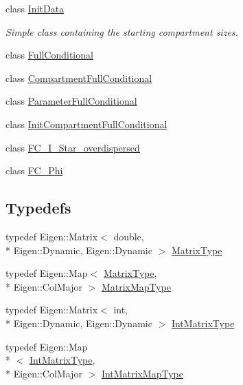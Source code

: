 \begin{DoxyCompactItemize}
class \hyperlink{classSpatialSEIR_1_1InitData}{Init\-Data}
\begin{DoxyCompactList}\small\item\em Simple class containing the starting compartment sizes. \end{DoxyCompactList}\item 
class \hyperlink{classSpatialSEIR_1_1FullConditional}{Full\-Conditional}
\item 
class \hyperlink{classSpatialSEIR_1_1CompartmentFullConditional}{Compartment\-Full\-Conditional}
\item 
class \hyperlink{classSpatialSEIR_1_1ParameterFullConditional}{Parameter\-Full\-Conditional}
\item 
class \hyperlink{classSpatialSEIR_1_1InitCompartmentFullConditional}{Init\-Compartment\-Full\-Conditional}
\item 
class \hyperlink{classSpatialSEIR_1_1FC__I__Star__overdispersed}{F\-C\-\_\-\-I\-\_\-\-Star\-\_\-overdispersed}
\item 
class \hyperlink{classSpatialSEIR_1_1FC__Phi}{F\-C\-\_\-\-Phi}
\end{DoxyCompactItemize}
\subsection*{Typedefs}
\begin{DoxyCompactItemize}
\item 
typedef Eigen\-::\-Matrix$<$ double, \\*
Eigen\-::\-Dynamic, Eigen\-::\-Dynamic $>$ \hyperlink{namespaceSpatialSEIR_a998a0502213346d0f88197c232de3331}{Matrix\-Type}
\item 
typedef Eigen\-::\-Map$<$ \hyperlink{namespaceSpatialSEIR_a998a0502213346d0f88197c232de3331}{Matrix\-Type}, \\*
Eigen\-::\-Col\-Major $>$ \hyperlink{namespaceSpatialSEIR_a56ce20bdcae25d006d2ddc637596dbd3}{Matrix\-Map\-Type}
\item 
typedef Eigen\-::\-Matrix$<$ int, \\*
Eigen\-::\-Dynamic, Eigen\-::\-Dynamic $>$ \hyperlink{namespaceSpatialSEIR_a61e75b01f74b5a08c1528ac3bce40efd}{Int\-Matrix\-Type}
\item 
typedef Eigen\-::\-Map\\*
$<$ \hyperlink{namespaceSpatialSEIR_a61e75b01f74b5a08c1528ac3bce40efd}{Int\-Matrix\-Type}, \\*
Eigen\-::\-Col\-Major $>$ \hyperlink{namespaceSpatialSEIR_aef5eeacdd778eee57264f9ca171dd505}{Int\-Matrix\-Map\-Type}
\end{DoxyCompactItemize}
